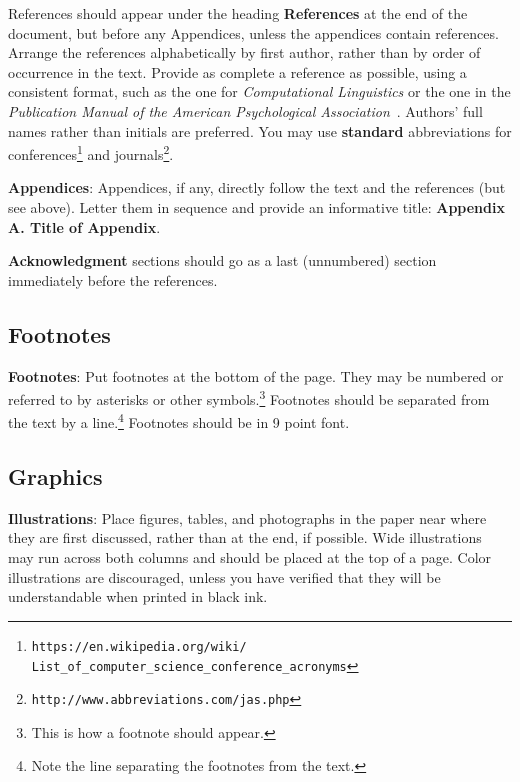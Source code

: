 \documentclass{article}
\begin{document}
References should appear under the heading {\bf References} at the 
end of the document, but before any Appendices, unless the appendices contain references.  
Arrange the references alphabetically
by first author, rather than by order of occurrence in the text.  %
Provide as complete a reference as possible, using a consistent format,
such as the one for {\em Computational Linguistics\/} or the one in the 
{\em Publication Manual of the American 
Psychological Association\/}~\cite{APA:83}.  Authors' full names rather than initials are preferred.  You may use
{\bf standard} abbreviations for conferences\footnote{\scriptsize {\tt https://en.wikipedia.org/wiki/ \\ \-\hspace{.75cm} List\_of\_computer\_science\_conference\_acronyms}} and journals\footnote{\tt http://www.abbreviations.com/jas.php}.




{\bf Appendices}: Appendices, if any, directly follow the text and the
references (but see above).  Letter them in sequence and provide an
informative title: {\bf Appendix A. Title of Appendix}.

\textbf{Acknowledgment} sections should go as a last (unnumbered) section immediately
before the references.  


\subsection{Footnotes}

{\bf Footnotes}: Put footnotes at the bottom of the page. They may
be numbered or referred to by asterisks or other
symbols.\footnote{This is how a footnote should appear.} Footnotes
should be separated from the text by a line.\footnote{Note the
line separating the footnotes from the text.}  Footnotes should be in 9 point font.

\subsection{Graphics}

{\bf Illustrations}: Place figures, tables, and photographs in the
paper near where they are first discussed, rather than at the end, if
possible.  Wide illustrations may run across both columns and should be placed at
the top of a page. Color illustrations are discouraged, unless you have verified that 
they will be understandable when printed in black ink. 
\end{document}
